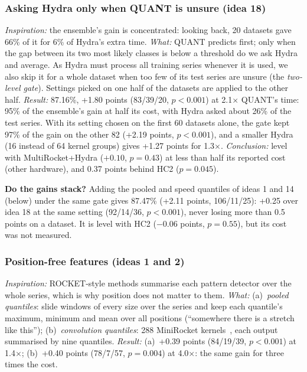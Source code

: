 \documentclass[conference]{IEEEtran}
\begin{document}
\subsubsection{Asking Hydra only when QUANT is unsure (idea 18)}
\label{sec:gate}
\emph{Inspiration:} the ensemble's gain is concentrated: looking back, 20 datasets gave 66\% of it for 6\% of Hydra's extra time. \emph{What:} QUANT predicts first; only when the gap between its two most likely classes is below a threshold do we ask Hydra and average. As Hydra must process all training series whenever it is used, we also skip it for a whole dataset when too few of its test series are unsure (the \emph{two-level gate}). Settings picked on one half of the datasets are applied to the other half. \emph{Result:} 87.16\%, +1.80 points (83/39/20, $p<0.001$) at 2.1$\times$ QUANT's time: 95\% of the ensemble's gain at half its cost, with Hydra asked about 26\% of the test series. With its setting chosen on the first 60 datasets alone, the gate kept 97\% of the gain on the other 82 (+2.19 points, $p<0.001$), and a smaller Hydra (16 instead of 64 kernel groups) gives +1.27 points for 1.3$\times$. \emph{Conclusion:} level with MultiRocket+Hydra ($+0.10$, $p=0.43$) at less than half its reported cost (other hardware), and 0.37 points behind HC2 ($p=0.045$).

\textbf{Do the gains stack?} Adding the pooled and speed quantiles of ideas 1 and 14 (below) under the same gate gives 87.47\% (+2.11 points, 106/11/25): +0.25 over idea 18 at the same setting (92/14/36, $p<0.001$), never losing more than 0.5 points on a dataset. It is level with HC2 ($-0.06$ points, $p=0.55$), but its cost was not measured.

\subsubsection{Position-free features (ideas 1 and 2)}
\emph{Inspiration:} ROCKET-style methods summarise each pattern detector over the whole series, which is why position does not matter to them. \emph{What:} (a)~\emph{pooled quantiles}: slide windows of every size over the series and keep each quantile's maximum, minimum and mean over all positions (``somewhere there is a stretch like this''); (b)~\emph{convolution quantiles}: 288 MiniRocket kernels~\cite{minirocket}, each output summarised by nine quantiles. \emph{Result:} (a)~+0.39 points (84/19/39, $p<0.001$) at 1.4$\times$; (b)~+0.40 points (78/7/57, $p=0.004$) at 4.0$\times$: the same gain for three times the cost.
\end{document}

